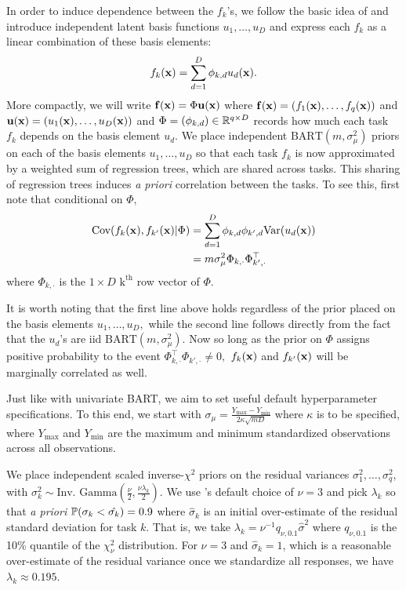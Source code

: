 \documentclass[12pt]{article}
\begin{document}
In order to induce dependence between the $f_{k}$'s, we follow the basic idea of \citet{Teh2004} and introduce independent latent basis functions $u_{1}, \ldots, u_{D}$ and express each $f_{k}$ as a linear combination of these basis elements:
$$
f_{k}(\bx) = \sum_{d = 1}^{D}{\phi_{k,d}u_{d}(\bx)}.
$$
More compactly, we will write $\bf(\bx) = \Phi\bu(\bx)$ where $\bf(\bx) = (f_{1}(\bx), \ldots, f_{q}(\bx))$ and $\bu(\bx) = (u_{1}(\bx), \ldots, u_{D}(\bx))$ and $\Phi = (\phi_{k,d}) \in \R^{q \times D}$ records how much each task $f_{k}$ depends on the basis element $u_{d}.$
We place independent $\text{BART}(m, \sigma^{2}_{\mu})$ priors on each of the basis elements $u_{1}, \ldots, u_{D}$ so that each task $f_{k}$ is now approximated by a weighted sum of regression trees, which are shared across tasks.
This sharing of regression trees induces \textit{a priori} correlation between the tasks.
To see this, first note that conditional on $\Phi,$
\begin{align*}
\text{Cov}(f_{k}(\bx), f_{k'}(\bx) | \Phi) &= \sum_{d = 1}^{D}{\phi_{k,d}\phi_{k',d}\text{Var}(u_{d}(\bx))} \\
&= m\sigma^{2}_{\mu}\Phi_{k,\cdot}\Phi_{k',\cdot}^{\top}
\end{align*}
where $\Phi_{k,\cdot}$ is the $1 \times D$ $\text{k}^{\text{th}}$ row vector of $\Phi.$

It is worth noting that the first line above holds regardless of the prior placed on the basis elements $u_{1}, \ldots, u_{D},$ while the second line follows directly from the fact that the $u_{d}$'s are iid $\text{BART}(m,\sigma^{2}_{\mu}).$
Now so long as the prior on $\Phi$ assigns positive probability to the event $\Phi_{k,\cdot}^{\top}\Phi_{k',\cdot} \neq 0,$ $f_{k}(\bx)$ and $f_{k'}(\bx)$ will be marginally correlated as well. 

Just like with univariate BART, we aim to set useful default hyperparameter specifications.
To this end, we start with $\sigma_{\mu} = \frac{Y_{\max} - Y_{\min}}{2\kappa \sqrt{mD}}$ where $\kappa$ is to be specified, where $Y_{\max}$ and $Y_{\min}$ are the maximum and minimum standardized observations across all observations.

We place independent scaled inverse-$\chi^{2}$ priors on the residual variances $\sigma^{2}_{1}, \ldots, \sigma^{2}_{q}$, with $\sigma^{2}_{k} \sim \text{Inv. Gamma}\left(\frac{\nu}{2}, \frac{\nu\lambda_{k}}{2}\right).$
We use \citet{Chipman2010}'s default choice of $\nu = 3$ and pick $\lambda_{k}$ so that \textit{a priori} $\P(\sigma_{k} < \hat{\sigma_{k}}) = 0.9$ where $\hat{\sigma}_{k}$ is an initial over-estimate of the residual standard deviation for task $k.$
That is, we take $\lambda_{k} = \nu^{-1}q_{\nu,0.1}\hat{\sigma}^{2}$ where $q_{\nu,0.1}$ is the 10\% quantile of the $\chi^{2}_{\nu}$ distribution.
For $\nu = 3$ and $\hat{\sigma}_{k} = 1$, which is a reasonable over-estimate of the residual variance once we standardize all responses, we have $\lambda_{k} \approx 0.195.$
\end{document}
